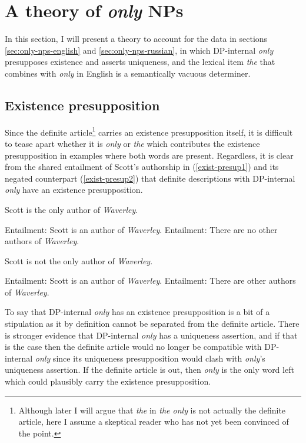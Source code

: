\section{A theory of \textit{only} NPs \label{sec:my-theory}}
In this section, I will present a theory to account for the data in sections \ref{sec:only-nps-english} and \ref{sec:only-nps-russian}, in which DP-internal \textit{only} presupposes existence and asserts uniqueness, and the lexical item \textit{the} that combines with \textit{only} in English is a semantically vacuous determiner.

\subsection{Existence presupposition}
Since the definite article\footnote{Although later I will argue that \textit{the} in \textit{the only} is not actually the definite article, here I assume a skeptical reader who has not yet been convinced of the point.} carries an existence presupposition itself, it is difficult to tease apart whether it is \textit{only} or \textit{the} which contributes the existence presupposition in examples where both words are present. Regardless, it is clear from the shared entailment of Scott's authorship in (\ref{exist-presup1}) and its negated counterpart (\ref{exist-presup2}) that definite descriptions with DP-internal \textit{only} have an existence presupposition.

\begin{exe}
	\ex \label{exist-presup1} Scott is the only author of \textit{Waverley}.
		\begin{xlist}
			\ex Entailment: Scott is an author of \textit{Waverley}.
			\ex Entailment: There are no other authors of \textit{Waverley}.
		\end{xlist}
	\ex \label{exist-presup2} Scott is not the only author of \textit{Waverley}.
		\begin{xlist}
			\ex Entailment: Scott is an author of \textit{Waverley}.
			\ex Entailment: There are other authors of \textit{Waverley}.
		\end{xlist}
\end{exe}

To say that DP-internal \textit{only} has an existence presupposition is a bit of a stipulation as it by definition cannot be separated from the definite article. There is stronger evidence that DP-internal \textit{only} has a uniqueness assertion, and if that is the case then the definite article would no longer be compatible with DP-internal \textit{only} since its uniqueness presupposition would clash with \textit{only}'s uniqueness assertion. If the definite article is out, then \textit{only} is the only word left which could plausibly carry the existence presupposition.

